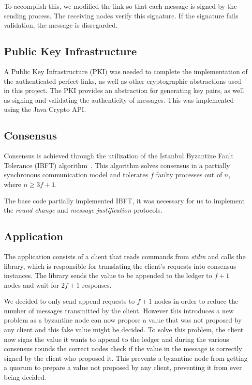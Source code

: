 \documentclass[letterpaper,twocolumn,10pt]{article}
\begin{document}
To accomplish this, we modified the link so that each message is signed by the sending process. The receiving nodes verify this signature. If the signature fails validation, the message is disregarded.

\subsection{Public Key Infrastructure}

A Public Key Infrastructure (PKI) was needed to complete the implementation of the authenticated perfect links, as well as other cryptographic abstractions used in this project. The PKI provides an abstraction for generating key pairs, as well as signing and validating the authenticity of messages. This was implemented using the Java Crypto API.

\subsection{Consensus}

Consensus is achieved through the utilization of the Istanbul Byzantine Fault Tolerance (IBFT) algorithm~\cite{ibft}. This algorithm solves consensus in a partially synchronous communication model and tolerates $f$ faulty processes out of $n$, where $n \geq 3f + 1$.

The base code partially implemented IBFT, it was necessary for us to implement the \textit{round change} and \textit{message justification} protocols.

\subsection{Application}

The application consists of a client that reads commands from \textit{stdin} and calls the library, which is responsible for translating the client's requests into consensus instances. The library sends the value to be appended to the ledger to $f+1$ nodes and wait for $2f+1$ responses.

We decided to only send append requests to $f+1$ nodes in order to reduce the number of messages transmitted by the client. However this introduces a new problem as a byzantine node can now propose a value that was not proposed by any client and this fake value might be decided. To solve this problem, the client now signs the value it wants to append to the ledger and during the various consensus rounds the correct nodes check if the value in the message is correctly signed by the client who proposed it. This prevents a byzantine node from getting a quorum to prepare a value not proposed by any client, preventing it from ever being decided.
\end{document}
